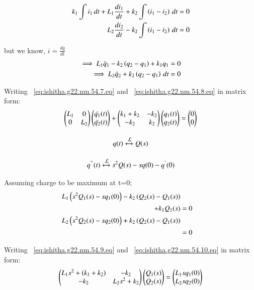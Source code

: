 \documentclass[journal,12pt,twocolumn]{IEEEtran}
\theoremstyle{remark}
\begin{document}
\begin{align}
 k_1\int i_1 \, dt + L_1\frac{di_1}{dt}+k_2\int \left(i_1-i_2\right) \, dt &=0
\label{eq:ishitha.g22.nm.54.5.eq} \\
 L_2\frac{di_2}{dt}-k_2\int \left(i_1-i_2\right) \, dt &=0
\label{eq:ishitha.g22.nm.54.6.eq} 
\end{align}

but we know, $i=\frac{dq}{dt}$ 
 \begin{align}
 \implies L_1\ddot q_1 -k_2\left(q_2-q_1\right) + k_1q_1  &=0 
 \label{eq:ishitha.g22.nm.54.7.eq} \\
 \implies L_2\ddot q_2+k_2\left(q_2-q_1\right) \, dt &=0
  \label{eq:ishitha.g22.nm.54.8.eq}
\end{align}  


Writing ~\eqref{eq:ishitha.g22.nm.54.7.eq} and ~\eqref{eq:ishitha.g22.nm.54.8.eq} in matrix form:
\begin{align}
\begin{pmatrix}
L_1 & 0  \\
0 & L_2
\end{pmatrix}
\begin{pmatrix}
\ddot{q_1}(t) \\
\ddot{q_2}(t)
\end{pmatrix}
+
\begin{pmatrix}
k_1+k_2 & -k_2  \\
-k_2 & k_2
\end{pmatrix}
\begin{pmatrix}
q_1(t) \\
q_2(t)
\end{pmatrix}
=
\begin{pmatrix}
0 \\
0
\end{pmatrix}
\end{align}

\begin{equation}
q(t)     \stackrel{}{\xleftrightarrow{\mathcal{L}}}   Q(s)  
\end{equation}


\begin{equation}
q^{''}(t) \stackrel{}{\xleftrightarrow{\mathcal{L}}} s^{2}Q(s)-sq(0)-q^{'}(0)
\end{equation}

Assuming charge to be maximum at t=0;
\begin{align}
L_1\left(s^2Q_1(s)-sq_1(0)\right) - k_2\left(Q_2(s)-Q_1(s)\right) \nonumber \\ + k_1Q_1(s) &= 0
\label{eq:ishitha.g22.nm.54.9.eq} \\
L_2\left(s^2Q_2(s)-sq_2(0)\right) + k_2\left(Q_2(s)-Q_1(s)\right)\nonumber \\&=0
\label{eq:ishitha.g22.nm.54.10.eq} 
\end{align}

Writing ~\eqref{eq:ishitha.g22.nm.54.9.eq} and ~\eqref{eq:ishitha.g22.nm.54.10.eq} in matrix form:
\begin{align}
\begin{pmatrix}
L_1s^2 + \left(k_1+k_2\right) & -k_2  \\
-k_2& L_2s^2+k_2
\end{pmatrix}
\begin{pmatrix}
Q_1(s) \\
Q_2(s)
\end{pmatrix}
=
\begin{pmatrix}
L_1sq_1(0) \\
L_2sq_2(0)
\end{pmatrix}
\end{align}
\end{document}
